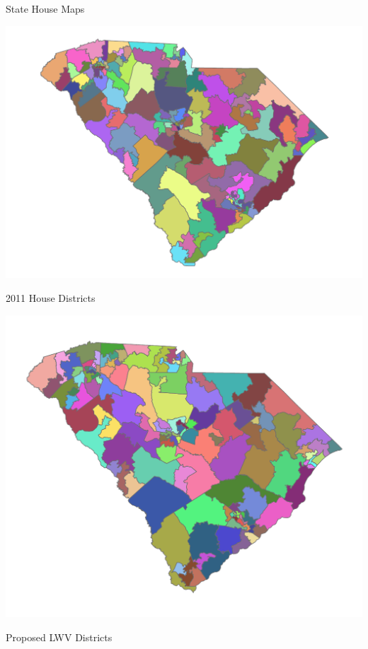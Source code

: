 \documentclass[xcolor=dvipsnames,table]{beamer}
\theoremstyle{plain}
\theoremstyle{definition}
\begin{document}
\begin{frame}{State House Maps}
\begin{minipage}{0.5\textwidth}
\hspace{-13mm}\includegraphics[scale=0.43]{House2011.pdf}

\hspace{5mm} 2011 House Districts
\end{minipage}%
\begin{minipage}{0.5\textwidth}
\hspace{-5mm} \includegraphics[scale=0.38]{House2021.pdf}

\vspace{-1mm}

\hspace{8mm} Proposed LWV Districts
\end{minipage}
\end{frame}
\end{document}
